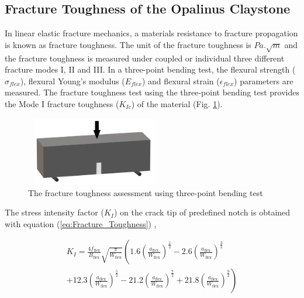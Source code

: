 \subsection{Fracture Toughness of the Opalinus Claystone}
\label{sec:Fracture_Toughness_Exp}

In linear elastic fracture mechanics, a materials resistance to fracture propagation is known as fracture toughness. The unit of the fracture toughness is $Pa.\sqrt m$ and the fracture toughness is measured under coupled or individual three different fracture modes I, II and III. In a three-point bending test, the flexural strength ($\sigma_{flex}$), flexural Young's modulus ($E_{flex}$) and flexural strain ($\epsilon_{flex}$) parameters are measured. The fracture toughness test using the three-point bending test provides the Mode I fracture toughness ($K_{Ic}$) of the material (Fig.  \ref{fig:Amir_Fracture_Toughness_Theory}).

\begin{figure}[!ht]
\centering
\includegraphics[width=6cm,height=3cm]{figures/Amir_Fracture_Toughness_Theory.png}
\caption{The fracture toughness assessment using three-point bending test}
\label{fig:Amir_Fracture_Toughness_Theory}
\end{figure} 

The stress intensity factor ($K_I$) on the crack tip of predefined notch is obtained with equation (\ref{eq:Fracture_Toughness}) \cite{Bower2009},

\begin{multline}
\label{eq:Fracture_Toughness}
K_I=
\frac{4f_\text{flex}}{B_\text{flex}}
\sqrt{\frac{\pi}{W_\text{flex}}}
\left(1.6
\left(\frac{a_\text{flex}}{W_\text{flex}}\right)^\frac{1}{2}
-
2.6\left(\frac{a_\text{flex}}{W_\text{flex}}\right)^\frac{3}{2} 
\right.
\\ 
\left.
+12.3\left(\frac{a_\text{flex}}{W_\text{flex}}\right)^\frac{5}{2} -21.2\left(\frac{a_\text{flex}}{W_\text{flex}}\right)^\frac{7}{2}
+21.8\left(\frac{a_\text{flex}}{W_\text{flex}}\right)^\frac{9}{2}
\right)
\end{multline}

